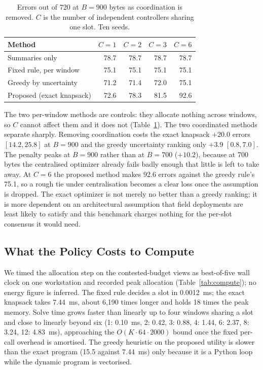 \documentclass[conference,a4paper]{IEEEtran}
\newif\ifsubmission
\newcommand{\masteronly}[1]{\ifsubmission\else#1\fi}
\newcommand{\mtab}[2]{\ifsubmission#2\else Table~\ref{#1}\fi}
\begin{document}
\masteronly{%
\begin{table}[t]
\caption{Errors out of 720 at $B=900$ bytes as coordination is removed. $C$ is the number of independent controllers sharing one slot. Ten seeds.}
\label{tab:coord}
\centering\footnotesize
\begin{tabular}{@{}lrrrr@{}}
\toprule
Method & $C=1$ & $C=2$ & $C=3$ & $C=6$ \\
\midrule
Summaries only & 78.7 & 78.7 & 78.7 & 78.7 \\
Fixed rule, per window & 75.1 & 75.1 & 75.1 & 75.1 \\
Greedy by uncertainty & 71.2 & 71.4 & 72.0 & 75.1 \\
Proposed (exact knapsack) & 72.6 & 78.3 & 81.5 & 92.6 \\
\bottomrule
\end{tabular}
\end{table}}%


The two per-window methods are controls: they allocate nothing across windows, so $C$ cannot affect them and it does not (\mtab{tab:coord}{full grid in the package}). The two coordinated methods separate sharply. Removing coordination costs the exact knapsack $+20.0$ errors $[14.2, 25.8]$ at $B=900$ and the greedy uncertainty ranking only $+3.9$ $[0.8, 7.0]$. The penalty peaks at $B=900$ rather than at $B=700$ ($+10.2$), because at 700 bytes the centralised optimizer already fails badly enough that little is left to take away. At $C=6$ the proposed method makes 92.6 errors against the greedy rule's 75.1, so a rough tie under centralisation becomes a clear loss once the assumption is dropped. The exact optimizer is not merely no better than a greedy ranking; it is more dependent on an architectural assumption that field deployments are least likely to satisfy and this benchmark charges nothing for the per-slot consensus it would need.

\subsection{What the Policy Costs to Compute}
\label{sec:compute}
We timed the allocation step on the contested-budget views as best-of-five wall clock on one workstation and recorded peak allocation (\mtab{tab:compute}{full table in the package}); no energy figure is inferred. The fixed rule decides a slot in 0.0012~ms; the exact knapsack takes 7.44~ms, about 6,190 times longer and holds 18 times the peak memory. Solve time grows faster than linearly up to four windows sharing a slot and close to linearly beyond six\masteronly{ (1: 0.10~ms, 2: 0.42, 3: 0.88, 4: 1.44, 6: 2.37, 8: 3.24, 12: 4.83~ms)}, approaching the $O(K\cdot64\cdot2000)$ bound once the fixed per-call overhead is amortised. The greedy heuristic on the proposed utility is slower than the exact program (15.5 against 7.44~ms) only because it is a Python loop while the dynamic program is vectorised.
\end{document}
